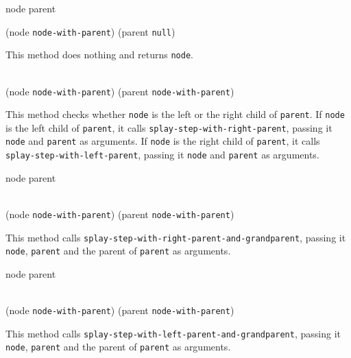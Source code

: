  {node parent}

{(node \texttt{node-with-parent}) (parent \texttt{null})}

This method does nothing and returns \texttt{node}.

\\
{(node \texttt{node-with-parent}) (parent \texttt{node-with-parent})}

This method checks whether \texttt{node} is the left or the right child
of \texttt{parent}.  If \texttt{node} is the left child of
\texttt{parent}, it calls \texttt{splay-step-with-right-parent},
passing it \texttt{node} and \texttt{parent} as arguments.  If
\texttt{node} is the right child of \texttt{parent}, it calls
\texttt{splay-step-with-left-parent}, passing it \texttt{node} and
\texttt{parent} as arguments.

 {node parent}

\\
{(node \texttt{node-with-parent}) (parent \texttt{node-with-parent})}

This method calls \texttt{splay-step-with-right-parent-and-grandparent},
passing it \texttt{node}, \texttt{parent} and the parent of
\texttt{parent} as arguments.

 {node parent}

\\
{(node \texttt{node-with-parent}) (parent \texttt{node-with-parent})}

This method calls \texttt{splay-step-with-left-parent-and-grandparent},
passing it \texttt{node}, \texttt{parent} and the parent of
\texttt{parent} as arguments.
